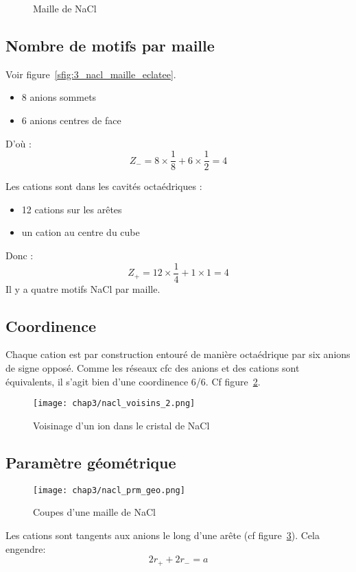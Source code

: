 \begin{figure}
    \centering
    \qquad
    \caption{Maille de NaCl}\label{fig:3_nacl_struct}
\end{figure}


\subsection{Nombre de motifs par maille}
Voir figure~\ref{sfig:3_nacl_maille_eclatee}.
\begin{itemize}
    \item 8 anions sommets
    \item 6 anions centres de face
\end{itemize}
D'où :
\begin{equation}
    Z_- = 8 \times \frac{1}{8} + 6 \times \frac{1}{2} = 4
\end{equation}


Les cations sont dans les cavités octaédriques  :
\begin{itemize}
    \item 12 cations sur les arêtes
    \item un cation au centre du cube
\end{itemize}
Donc :
\begin{equation}
    Z_+ = 12 \times \frac{1}{4} + 1 \times 1 = 4
\end{equation}
Il y a quatre motifs NaCl par maille.


\subsection{Coordinence}
Chaque cation est par construction entouré de manière octaédrique par six anions
de signe opposé. Comme les réseaux cfc des anions et des cations sont équivalents, il
s'agit bien d’une coordinence 6/6. Cf figure~\ref{fig:3_nacl_voisins}.
\begin{figure}
    \centering
    \texttt{[image: chap3/nacl\_voisins\_2.png]}
    \caption{Voisinage d'un ion dans le cristal de NaCl}
    \label{fig:3_nacl_voisins}
\end{figure}


\subsection{Paramètre géométrique}
\begin{figure}
    \centering
    \texttt{[image: chap3/nacl\_prm\_geo.png]}
    \caption{Coupes d'une maille de NaCl}\label{fig:3_nacl_maille_coupe}
\end{figure}
Les cations sont tangents aux anions le long d'une arête (cf figure~\ref{fig:3_nacl_maille_coupe}).
Cela engendre:
\begin{equation}
    2r_+ + 2r_- = a
    \label{eq:3_nacl_ar}
\end{equation}


